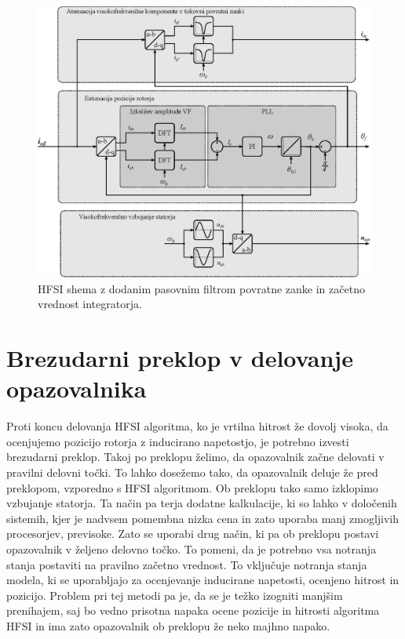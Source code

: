 \documentclass[a4paper,twoside,openright,12pt,slovene]{book}
\begin{document}
\begin{figure}[!htbp]
    \centering
    \includegraphics[width=0.95\columnwidth]{Slike/Inkscape/HFSI.eps}
    \caption{\label{HFSI} HFSI shema z dodanim pasovnim filtrom povratne zanke in začetno vrednost integratorja. }
\end{figure}

\section{Brezudarni preklop v delovanje opazovalnika}

Proti koncu delovanja HFSI algoritma, ko je vrtilna hitrost že dovolj visoka, da ocenjujemo pozicijo rotorja z inducirano napetostjo, je potrebno izvesti brezudarni preklop. Takoj po preklopu želimo,
da opazovalnik začne delovati v pravilni delovni točki. To lahko dosežemo tako, da opazovalnik deluje že pred preklopom, vzporedno s HFSI algoritmom. Ob preklopu tako samo izklopimo vzbujanje
statorja. Ta način pa terja dodatne kalkulacije, ki so lahko v določenih sistemih, kjer je nadvsem pomembna nizka cena in zato uporaba manj zmogljivih procesorjev, previsoke. Zato se uporabi drug
način, ki pa ob preklopu postavi opazovalnik v željeno delovno točko. To pomeni, da je potrebno vsa notranja stanja postaviti na pravilno začetno vrednost. To vključuje notranja stanja modela, ki se
uporabljajo za ocenjevanje inducirane napetosti, ocenjeno hitrost in pozicijo. Problem pri tej metodi pa je, da se je težko izogniti manjšim prenihajem, saj bo vedno prisotna napaka ocene
pozicije in hitrosti algoritma HFSI in ima zato opazovalnik ob preklopu že neko majhno napako. 
\end{document}
